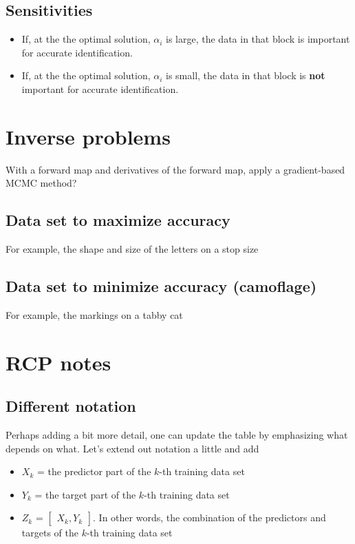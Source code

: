 \documentclass{article}
\begin{document}
\subsection{Sensitivities}

\begin{itemize}
    \item If, at the the optimal solution, $\alpha_i$ is large, the data in that block is important for accurate identification.
    \item If, at the the optimal solution, $\alpha_i$ is small, the data in that block is \textbf{not} important for accurate identification.
\end{itemize}


\section{Inverse problems}

With a forward map and derivatives of the forward map, apply a gradient-based MCMC method?

\subsection{Data set to maximize accuracy}
For example, the shape and size of the letters on a stop size

\subsection{Data set to minimize accuracy (camoflage)}
For example, the markings on a tabby cat

\section{RCP notes}
\subsection{Different notation}
Perhaps adding a bit more detail, one can update the table by emphasizing what depends on what. Let's extend out notation a little and add

\begin{itemize}
\item $X_k$ = the predictor part of the $k$-th training data set
\item $Y_k$ = the target part of the $k$-th training data set
\item $Z_k$ = $\begin{bmatrix} X_k, Y_k \end{bmatrix}$. In other words, the combination of the predictors and targets of the $k$-th training data set
\end{itemize}
\end{document}
